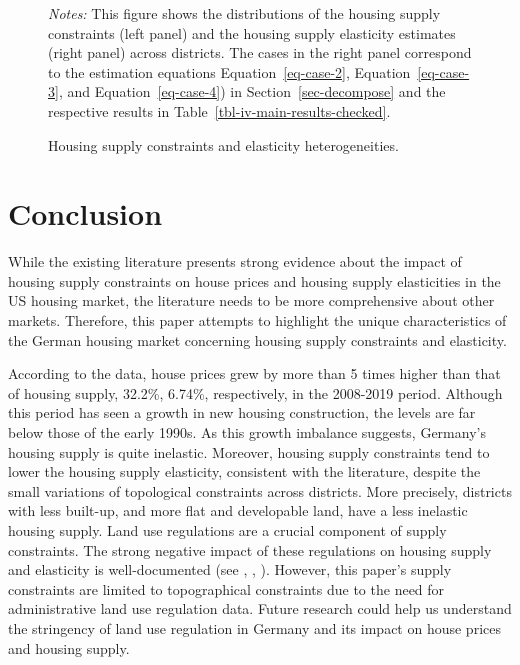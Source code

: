 \documentclass[
  12pt,
]{article}
\begin{document}
\begin{figure}
\begin{minipage}{0.50\linewidth}
{}


\end{minipage}%

\caption{\label{fig-distributions-elasticity-constraints}Housing supply
constraints and elasticity
heterogeneities.}
\begin{minipage}{0.975\textwidth}
\small
\emph{Notes:} This figure
shows the distributions of the housing supply constraints (left panel)
and the housing supply elasticity estimates (right panel) across
districts. The cases in the right panel correspond to the estimation
equations Equation~\ref{eq-case-2}, Equation~\ref{eq-case-3}, and
Equation~\ref{eq-case-4}) in Section~\ref{sec-decompose} and the
respective results in
Table~\ref{tbl-iv-main-results-checked}.
\end{minipage}


\end{figure}%

\section{Conclusion}\label{conclusion}

While the existing literature presents strong evidence about the impact
of housing supply constraints on house prices and housing supply
elasticities in the US housing market, the literature needs to be more
comprehensive about other markets. Therefore, this paper attempts to
highlight the unique characteristics of the German housing market
concerning housing supply constraints and elasticity.

According to the data, house prices grew by more than 5 times higher
than that of housing supply, 32.2\%, 6.74\%, respectively, in the
2008-2019 period. Although this period has seen a growth in new housing
construction, the levels are far below those of the early 1990s. As this
growth imbalance suggests, Germany's housing supply is quite inelastic.
Moreover, housing supply constraints tend to lower the housing supply
elasticity, consistent with the literature, despite the small variations
of topological constraints across districts. More precisely, districts
with less built-up, and more flat and developable land, have a less
inelastic housing supply. Land use regulations are a crucial component
of supply constraints. The strong negative impact of these regulations
on housing supply and elasticity is well-documented (see
\citet{glaeser_gyourko_2005}, \citet{saiz_2010},
\citet{baum-snow_han_2019}). However, this paper's supply constraints
are limited to topographical constraints due to the need for
administrative land use regulation data. Future research could help us
understand the stringency of land use regulation in Germany and its
impact on house prices and housing supply.
\end{document}
